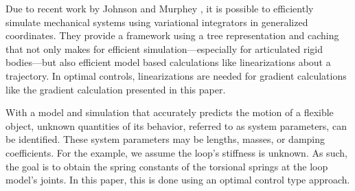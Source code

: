 \documentclass[letterpaper, 10pt, conference]{ieeeconf}
\begin{document}
Due to recent work by Johnson and Murphey \cite{johnson_murphey_scalable, johnson_murphey_linearization}, it is possible to efficiently simulate mechanical systems using variational integrators in generalized coordinates. They provide a framework using a tree representation and caching that not only makes for efficient simulation---especially for articulated rigid bodies---but also efficient model based calculations like linearizations about a trajectory.   In optimal controls, linearizations are needed for gradient calculations like the gradient calculation presented in this paper.  %

With a model and simulation that accurately predicts the motion of a flexible object, unknown quantities of its behavior, referred to as system parameters, can be identified.  These system parameters may be lengths, masses, or damping coefficients.  For the example, we assume the loop's stiffness is unknown.  As such, the goal is to obtain the spring constants of the torsional springs at the loop model's joints.  In this paper, this is done using an optimal control type approach.






\end{document}
